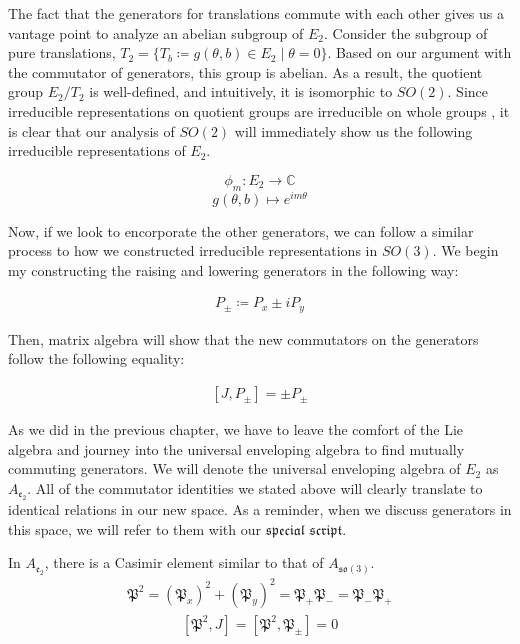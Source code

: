 \documentclass[10pt]{ucthesis}
\newcommand{\C}{\mathbb{C}}
\begin{document}
The fact that the generators for translations commute with each other gives us a vantage point to analyze an abelian subgroup of $E_2$. Consider the subgroup of pure translations, $T_2 = \{ T_b \coloneq g(\theta,b)\in E_2 \mid \theta=0\}$. Based on our argument with the commutator of generators, this group is abelian. As a result, the quotient group $E_2/T_2$ is well-defined, and intuitively, it is isomorphic to $SO(2)$. Since irreducible representations on quotient groups are irreducible on whole groups \cite{Mendes}, it is clear that our analysis of $SO(2)$ will immediately show us the following irreducible representations of $E_2$.

$$\phi_m:E_2\rightarrow \C$$
$$g(\theta,b)\mapsto e^{im\theta}$$

Now, if we look to encorporate the other generators, we can follow a similar process to how we constructed irreducible representations in $SO(3)$. We begin my constructing the raising and lowering generators in the following way:

\begin{equation}
\begin{aligned}
	P_\pm \coloneq P_x \pm iP_y
\end{aligned}
\end{equation}

 Then, matrix algebra will show that the new commutators on the generators follow the following equality:

\begin{equation}
\begin{aligned}
	[J,P_\pm] = \pm P_\pm 
\end{aligned}
\end{equation}

As we did in the previous chapter, we have to leave the comfort of the Lie algebra and journey into the universal enveloping algebra to find mutually commuting generators. We will denote the universal enveloping algebra of $E_2$ as $A_{\mathfrak{e_2}}$. All of the commutator identities we stated above will clearly translate to identical relations in our new space. As a reminder, when we discuss generators in this space, we will refer to them with our $\mathfrak{special}$ $\mathfrak{script}$. 

In $A_{\mathfrak{e_2}}$, there is a Casimir element similar to that of $A_{\mathfrak{so}(3)}$. 
\begin{equation}
\begin{aligned}
	\mathfrak{P}^2 = (\mathfrak{P}_x)^2 + (\mathfrak{P}_y)^2 = \mathfrak{P}_+\mathfrak{P}_- = \mathfrak{P}_-\mathfrak{P}_+
\end{aligned}
\end{equation}
\begin{equation}
\begin{aligned}
	[\mathfrak{P}^2,J] =[\mathfrak{P}^2,\mathfrak{P}_\pm]  = 0
\end{aligned}
\end{equation}
\end{document}
